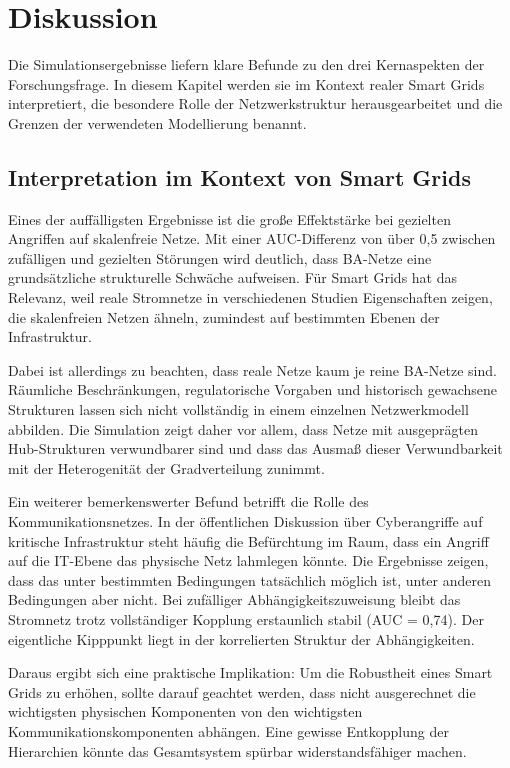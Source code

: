 \section{Diskussion}
\label{sec:diskussion}

Die Simulationsergebnisse liefern klare Befunde zu den drei Kernaspekten der Forschungsfrage. In diesem Kapitel werden sie im Kontext realer Smart Grids interpretiert, die besondere Rolle der Netzwerkstruktur herausgearbeitet und die Grenzen der verwendeten Modellierung benannt.

\subsection{Interpretation im Kontext von Smart Grids}

Eines der auffälligsten Ergebnisse ist die große Effektstärke bei gezielten Angriffen auf skalenfreie Netze. Mit einer AUC-Differenz von über 0,5 zwischen zufälligen und gezielten Störungen wird deutlich, dass BA-Netze eine grundsätzliche strukturelle Schwäche aufweisen. Für Smart Grids hat das Relevanz, weil reale Stromnetze in verschiedenen Studien Eigenschaften zeigen, die skalenfreien Netzen ähneln, zumindest auf bestimmten Ebenen der Infrastruktur.

Dabei ist allerdings zu beachten, dass reale Netze kaum je reine BA-Netze sind. Räumliche Beschränkungen, regulatorische Vorgaben und historisch gewachsene Strukturen lassen sich nicht vollständig in einem einzelnen Netzwerkmodell abbilden. Die Simulation zeigt daher vor allem, dass Netze mit ausgeprägten Hub-Strukturen verwundbarer sind und dass das Ausmaß dieser Verwundbarkeit mit der Heterogenität der Gradverteilung zunimmt.

Ein weiterer bemerkenswerter Befund betrifft die Rolle des Kommunikationsnetzes. In der öffentlichen Diskussion über Cyberangriffe auf kritische Infrastruktur steht häufig die Befürchtung im Raum, dass ein Angriff auf die IT-Ebene das physische Netz lahmlegen könnte. Die Ergebnisse zeigen, dass das unter bestimmten Bedingungen tatsächlich möglich ist, unter anderen Bedingungen aber nicht. Bei zufälliger Abhängigkeitszuweisung bleibt das Stromnetz trotz vollständiger Kopplung erstaunlich stabil (AUC = 0,74). Der eigentliche Kipppunkt liegt in der korrelierten Struktur der Abhängigkeiten.

Daraus ergibt sich eine praktische Implikation: Um die Robustheit eines Smart Grids zu erhöhen, sollte darauf geachtet werden, dass nicht ausgerechnet die wichtigsten physischen Komponenten von den wichtigsten Kommunikationskomponenten abhängen. Eine gewisse Entkopplung der Hierarchien könnte das Gesamtsystem spürbar widerstandsfähiger machen.

